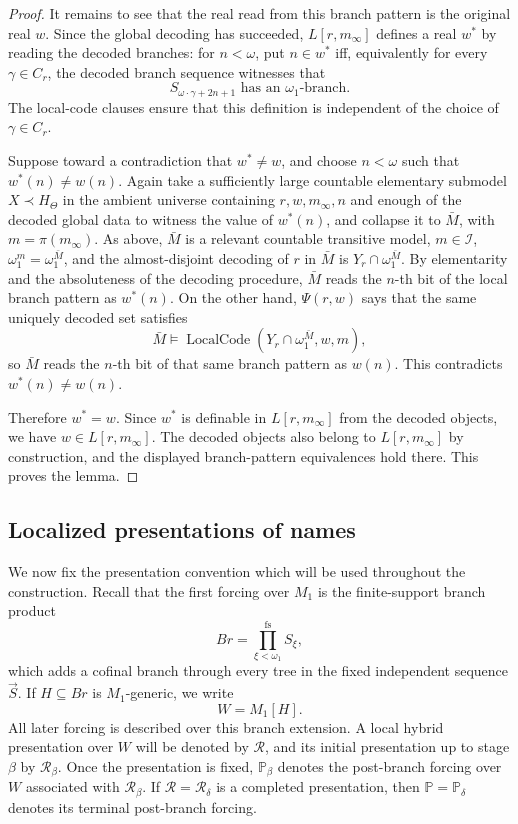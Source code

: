 \documentclass[a4paper,11pt]{article}
\begin{document}
\begin{proof}
It remains to see that the real read from this branch pattern is the original real $w$.  Since the global decoding has succeeded, $L[r,m_\infty]$ defines a real $w^*$ by reading the decoded branches: for $n<\omega$, put $n\in w^*$ iff, equivalently for every $\gamma\in C_r$, the decoded branch sequence witnesses that
\[
   S_{\omega\cdot\gamma+2n+1}
   \text{ has an }\omega_1\text{-branch}.
\]
The local-code clauses ensure that this definition is independent of the choice of $\gamma\in C_r$.

Suppose toward a contradiction that $w^*\neq w$, and choose $n<\omega$ such that $w^*(n)\neq w(n)$.  Again take a sufficiently large countable elementary submodel $X\prec H_\Theta$ in the ambient universe containing $r,w,m_\infty,n$ and enough of the decoded global data to witness the value of $w^*(n)$, and collapse it to $\bar M$, with $m=\pi(m_\infty)$.  As above, $\bar M$ is a relevant countable transitive model, $m\in\mathcal I$, $\omega_1^m=\omega_1^{\bar M}$, and the almost-disjoint decoding of $r$ in $\bar M$ is $Y_r\cap\omega_1^{\bar M}$.  By elementarity and the absoluteness of the decoding procedure, $\bar M$ reads the $n$-th bit of the local branch pattern as $w^*(n)$.  On the other hand, $\Psi(r,w)$ says that the same uniquely decoded set satisfies
\[
   \bar M\models
      \operatorname{LocalCode}(Y_r\cap\omega_1^{\bar M},w,m),
\]
so $\bar M$ reads the $n$-th bit of that same branch pattern as $w(n)$.  This contradicts $w^*(n)\neq w(n)$.

Therefore $w^*=w$.  Since $w^*$ is definable in $L[r,m_\infty]$ from the decoded objects, we have $w\in L[r,m_\infty]$.  The decoded objects also belong to $L[r,m_\infty]$ by construction, and the displayed branch-pattern equivalences hold there.  This proves the lemma.
\end{proof}



\subsection{Localized presentations of names}\label{subsec:localized-presentations}

We now fix the presentation convention which will be used throughout the
construction.  Recall that the first forcing over \(M_1\) is the finite-support
branch product
\[
   Br=\prod_{\xi<\omega_1}^{\mathrm{fs}}S_\xi,
\]
which adds a cofinal branch through every tree in the fixed independent
sequence \(\vec S\).  If \(H\subseteq Br\) is \(M_1\)-generic, we write
\[
   W=M_1[H].
\]
All later forcing is described over this branch extension.  A local hybrid
presentation over \(W\) will be denoted by \(\mathcal R\), and its initial
presentation up to stage \(\beta\) by \(\mathcal R_\beta\).  Once the
presentation is fixed, \(\mathbb P_\beta\) denotes the post-branch forcing over
\(W\) associated with \(\mathcal R_\beta\).  If \(\mathcal R=\mathcal R_\delta\)
is a completed presentation, then \(\mathbb P=\mathbb P_\delta\) denotes its
terminal post-branch forcing.
\end{document}
